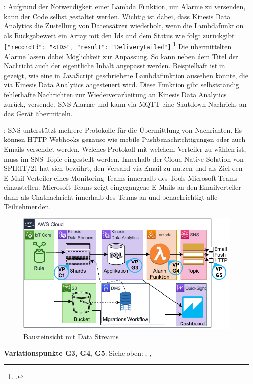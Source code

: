 : Aufgrund der Notwendigkeit einer Lambda Funktion, um Alarme zu versenden, kann der Code selbst gestaltet werden. Wichtig ist dabei, dass Kinesis Data Analytics die Zustellung von Datensätzen wiederholt, wenn die Lambdafunktion als Rückgabewert ein Array mit den Ids und dem Status wie folgt zurückgibt: \texttt{[{"recordId": "<ID>", "result": "DeliveryFailed"}]}.\footcite[Vgl.][]{AmazonWebServicesInc..o.J.ay} Die übermittelten Alarme lassen dabei Möglichkeit zur Anpassung. So kann neben dem Titel der Nachricht auch der eigentliche Inhalt angepasst werden. Beispielhaft ist in  gezeigt, wie eine in JavaScript geschriebene Lambdafunktion aussehen könnte, die via Kinesis Data Analytics angesteuert wird. Diese Funktion gibt selbstständig fehlerhafte Nachrichten zur Wiederverarbeitung an Kinesis Data Analytics zurück, versendet \ac{SNS} Alarme und kann via \ac{MQTT} eine Shutdown Nachricht an das Gerät übermitteln.

: \ac{SNS} unterstützt mehrere Protokolle für die Übermittlung von Nachrichten. Es können HTTP Webhooks genauso wie mobile Pushbenachrichtigungen oder auch Emails versendet werden. Welches Protokoll mit welchem Verteiler zu wählen ist, muss im \ac{SNS} Topic eingestellt werden. Innerhalb der Cloud Native Solution von SPIRIT/21 hat sich bewährt, den Versand via Email zu nutzen und als Ziel den E-Mail-Verteiler eines Monitoring Teams innerhalb des Tools Microsoft Teams einzustellen. Microsoft Teams zeigt eingegangene E-Mails an den Emailverteiler dann als Chatnachricht innerhalb des Teams an und benachrichtigt alle Teilnehmenden.

\begin{figure}[H]
\centering
\includegraphics[width=\textwidth]{graphics/Echtzeit-RA-Elements.pdf}
\caption{Bausteinsicht mit Data Streams}
\label{abb:ElementeEchtzeitRAStreams}
\end{figure}
\textbf{Variationspunkte G3, G4, G5}: Siehe oben: , , 

